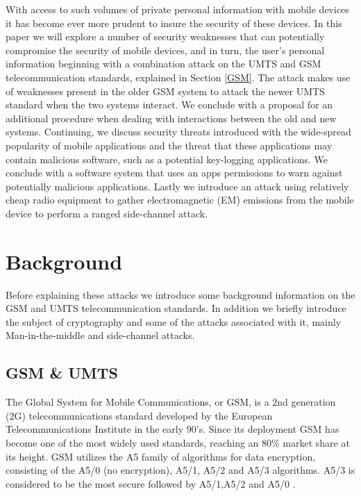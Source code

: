\documentclass{sig-alternate}
\begin{document}

With access to such volumes of private personal information with mobile devices it has become ever more prudent to insure the security of these devices. In this paper we will explore a number of security weaknesses that can potentially compromise the security of mobile devices, and in turn, the user's personal information beginning with a combination attack on the UMTS and GSM telecommunication standards, explained in Section \ref{GSM}. The attack makes use of weaknesses present in the older GSM system to attack the newer UMTS standard when the two systems interact. We conclude with a proposal for an additional procedure when dealing with interactions between the old and new systems. Continuing, we discuss security threats introduced with the wide-spread popularity of mobile applications and the threat that these applications may contain malicious software, such as a potential key-logging applications. We conclude with a software system that uses an apps permissions to warn against potentially malicious applications. Lastly we introduce an attack using relatively cheap radio equipment to gather electromagnetic (EM) emissions from the mobile device to perform a ranged side-channel attack.         

\section{Background}
	
Before explaining these attacks we introduce some background information on the GSM and UMTS telecommunication standards. In addition we briefly introduce the subject of cryptography and some of the attacks associated with it, mainly Man-in-the-middle and side-channel attacks.    	
	\subsection{GSM \& UMTS \label{GSM}}
	The Global System for Mobile Communications, or GSM, is a 2nd generation (2G) telecommunications standard developed by the European Telecommunications Institute in the early 90's. Since its deployment GSM has become one of the most widely used standards, reaching an 80\% market share at its height. GSM utilizes the A5 family of algorithms for data encryption, consisting of the A5/0 (no encryption), A5/1, A5/2 and A5/3 algorithms. A5/3 is considered to be the most secure followed by A5/1,A5/2 and A5/0 \cite{wiki:GSM}.  
\end{document}
